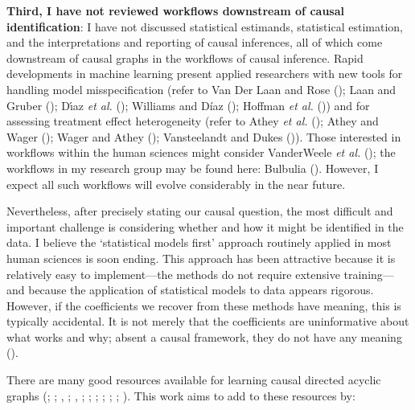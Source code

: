 \documentclass[
  single column]{article}
\begin{document}
\textbf{Third, I have not reviewed workflows downstream of causal
identification}: I have not discussed statistical estimands, statistical
estimation, and the interpretations and reporting of causal inferences,
all of which come downstream of causal graphs in the workflows of causal
inference. Rapid developments in machine learning present applied
researchers with new tools for handling model misspecification (refer to
Van Der Laan and Rose (); Laan and
Gruber (); Dı́az \emph{et al.}
(); Williams and Díaz
(); Hoffman \emph{et al.}
()) and for assessing treatment effect
heterogeneity (refer to Athey \emph{et al.}
(); Athey and Wager
(); Wager and Athey
(); Vansteelandt and Dukes
()). Those interested in workflows
within the human sciences might consider VanderWeele \emph{et al.}
(); the workflows in my research
group may be found here: Bulbulia
(). However, I expect all
such workflows will evolve considerably in the near future.

Nevertheless, after precisely stating our causal question, the most
difficult and important challenge is considering whether and how it
might be identified in the data. I believe the `statistical models
first' approach routinely applied in most human sciences is soon ending.
This approach has been attractive because it is relatively easy to
implement---the methods do not require extensive training---and because
the application of statistical models to data appears rigorous. However,
if the coefficients we recover from these methods have meaning, this is
typically accidental. It is not merely that the coefficients are
uninformative about what works and why; absent a causal framework, they
do not have any meaning ().

There are many good resources available for learning causal directed
acyclic graphs (;
;
,
; , ;
;
;
;
; ; ). This work
aims to add to these resources by:
\end{document}
